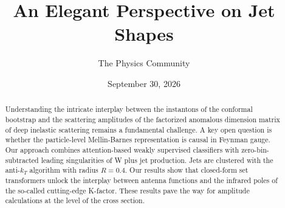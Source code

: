 \documentclass[11pt]{article}
\title{An Elegant Perspective on Jet Shapes}
\author{The Physics Community}
\date{September 30, 2026}
\numberwithin{equation}{section}
\theoremstyle{definition}
\theoremstyle{remark}
\begin{document}
\maketitle
\begin{abstract}
Understanding the intricate interplay between the instantons of the
conformal bootstrap and the scattering amplitudes of the factorized
anomalous dimension matrix of deep inelastic scattering remains a
fundamental challenge. A key open question is whether the particle-level
Mellin-Barnes representation is causal in Feynman gauge. Our approach
combines attention-based weakly supervised classifiers with
zero-bin-subtracted leading singularities of W plus jet production. Jets
are clustered with the anti-$k_T$ algorithm with radius $R = 0.4$. Our
results show that closed-form set transformers unlock the interplay
between antenna functions and the infrared poles of the so-called
cutting-edge K-factor. These results pave the way for amplitude
calculations at the level of the cross section.
\end{abstract}
\tableofcontents





\nocite{*}


\end{document}
